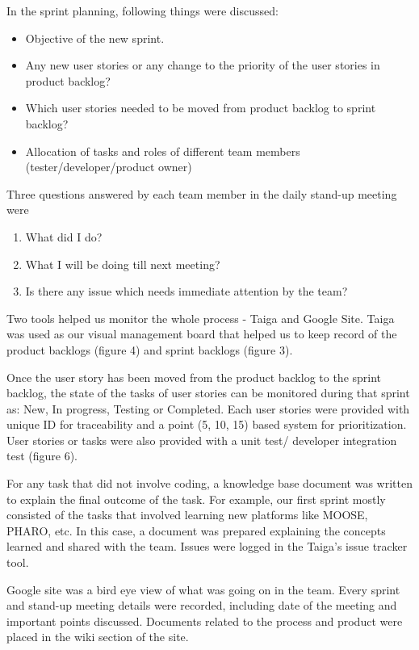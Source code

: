 \documentclass[11pt]{article}
\begin{document}
In the sprint planning, following things were discussed: 
\begin{itemize}
\item Objective of the new sprint.
\item Any new user stories or any change to the priority of the user stories 
in product backlog?
\item  Which user stories needed to be moved from product backlog to sprint backlog? 
\item Allocation of tasks and roles of different team members (tester/developer/product owner)

\end{itemize}
 
Three questions answered by each team member in the daily stand-up meeting were 
\begin{enumerate}
\item What did I do?
\item What I will be doing till next meeting? 
\item Is there any issue which needs immediate attention by the team? 
\end{enumerate}

Two tools helped us monitor the whole process - Taiga\cite{TaigaSite} and Google Site\cite{GoogleSite}. Taiga was used as our visual management board that helped us to keep record of the product backlogs (figure 4) and sprint backlogs (figure 3). 

Once the user story has been moved from the product backlog to the sprint backlog, the state of the tasks of user stories can be monitored during that sprint as: New, In progress, Testing or Completed. Each user stories were provided with unique ID for traceability and a point (5, 10, 15) based system for prioritization. User stories or tasks were also provided with a unit test/ developer integration test (figure 6). 

For any task that did not involve coding, a knowledge base document was written to explain the final outcome of the task. For example, our first sprint mostly consisted of the tasks that involved learning new platforms like MOOSE, PHARO, etc. In this case, a document was prepared explaining the concepts learned and shared with the team. Issues were logged in the Taiga’s issue tracker tool. 

Google site\cite{GoogleSite} was a bird eye view of what was going on in the team. Every sprint and stand-up meeting details were recorded, including date of the meeting and important points discussed. Documents related to the process and product were placed in the wiki section of the site. 
\end{document}
